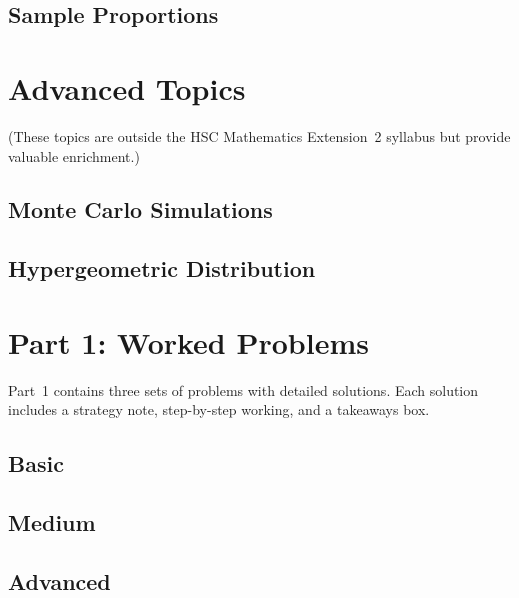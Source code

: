 \documentclass[12pt]{article}
\begin{document}
\subsection{Sample Proportions}


\section{Advanced Topics}
\label{sec:advanced}
(These topics are outside the HSC Mathematics Extension~2 syllabus but provide valuable enrichment.)

\subsection{Monte Carlo Simulations}


\subsection{Hypergeometric Distribution}


\section{Part 1: Worked Problems}

Part~1 contains three sets of problems with detailed solutions. Each solution includes a strategy note, step-by-step working, and a takeaways box.

\subsection{Basic}


\subsection{Medium}


\subsection{Advanced}

\end{document}
